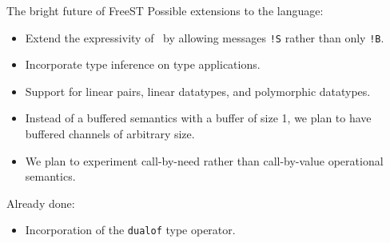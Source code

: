 \documentclass[10pt]{beamer}
\begin{document}
\begin{frame}[fragile]{The bright future of FreeST}
Possible extensions to the language:
\begin{itemize}
	\item Extend the expressivity of \freest\ by allowing messages \lstinline|!S| rather than only \lstinline|!B|.
	\item Incorporate type inference on type applications.
	\item Support for linear pairs, linear datatypes, and polymorphic datatypes.
	\item Instead of a buffered semantics with a buffer of size 1, we plan to have buffered channels of arbitrary size.
	\item We plan to experiment call-by-need rather than call-by-value operational semantics.
\end{itemize}

Already done:
\begin{itemize}
	\item Incorporation of the \lstinline|dualof| type operator.
\end{itemize}
	
\end{frame}

\end{document}
